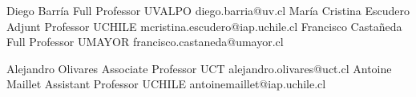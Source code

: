 





\begin{referees}
		{Diego Barría}
		{Full Professor}
		{UVALPO}
		{diego.barria@uv.cl}
		{María Cristina Escudero}
		{Adjunt Professor}
		{UCHILE}
		{mcristina.escudero@iap.uchile.cl}
		{Francisco Castañeda}
		{Full Professor}
		{UMAYOR}
		{francisco.castaneda@umayor.cl}
\end{referees}

\begin{referees}
		{Alejandro Olivares}
		{Associate Professor}
		{UCT}
		{alejandro.olivares@uct.cl}
		{Antoine Maillet}
		{Assistant Professor}
		{UCHILE}
		{antoinemaillet@iap.uchile.cl}
\end{referees}
